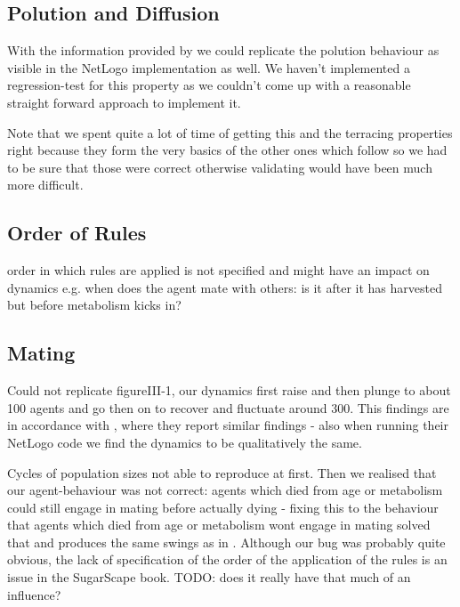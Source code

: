 \subsection{Polution and Diffusion}
With the information provided by \cite{weaver_replicating_nodate} we could replicate the polution behaviour as visible in the NetLogo implementation as well. We haven't implemented a regression-test for this property as we couldn't come up with a reasonable straight forward approach to implement it.

Note that we spent quite a lot of time of getting this and the terracing properties right because they form the very basics of the other ones which follow so we had to be sure that those were correct otherwise validating would have been much more difficult.

\subsection{Order of Rules}
order in which rules are applied is not specified and might have an impact on dynamics e.g. when does the agent mate with others: is it after it has harvested but before metabolism kicks in?

\subsection{Mating}
Could not replicate figureIII-1, our dynamics first raise and then plunge to about 100 agents and go then on to recover and fluctuate around 300. This findings are in accordance with \cite{weaver_replicating_nodate}, where they report similar findings - also when running their NetLogo code we find the dynamics to be qualitatively the same.

Cycles of population sizes not able to reproduce at first. Then we realised that our agent-behaviour was not correct: agents which died from age or metabolism could still engage in mating before actually dying - fixing this to the behaviour that agents which died from age or metabolism wont engage in mating solved that and produces the same swings as in \cite{weaver_replicating_nodate}.
Although our bug was probably quite obvious, the lack of specification of the order of the application of the rules is an issue in the SugarScape book. TODO: does it really have that much of an influence?

